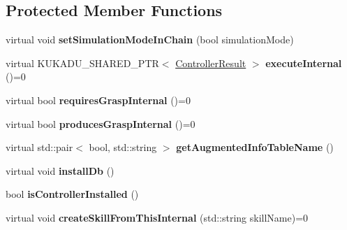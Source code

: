 \subsection*{Protected Member Functions}
\begin{DoxyCompactItemize}
\item 
virtual void {\bfseries set\+Simulation\+Mode\+In\+Chain} (bool simulation\+Mode)\hypertarget{classkukadu_1_1Controller_a07c70a71d6028cb711567d55e2010430}{}\label{classkukadu_1_1Controller_a07c70a71d6028cb711567d55e2010430}

\item 
virtual K\+U\+K\+A\+D\+U\+\_\+\+S\+H\+A\+R\+E\+D\+\_\+\+P\+TR$<$ \hyperlink{classkukadu_1_1ControllerResult}{Controller\+Result} $>$ {\bfseries execute\+Internal} ()=0\hypertarget{classkukadu_1_1Controller_ad32ce108f7ab90d8631e7262239433ac}{}\label{classkukadu_1_1Controller_ad32ce108f7ab90d8631e7262239433ac}

\item 
virtual bool {\bfseries requires\+Grasp\+Internal} ()=0\hypertarget{classkukadu_1_1Controller_ae67659a3a55cef09b2a5575107d88145}{}\label{classkukadu_1_1Controller_ae67659a3a55cef09b2a5575107d88145}

\item 
virtual bool {\bfseries produces\+Grasp\+Internal} ()=0\hypertarget{classkukadu_1_1Controller_a5566a7cf711318f1bf4dcd939ba7fe76}{}\label{classkukadu_1_1Controller_a5566a7cf711318f1bf4dcd939ba7fe76}

\item 
virtual std\+::pair$<$ bool, std\+::string $>$ {\bfseries get\+Augmented\+Info\+Table\+Name} ()\hypertarget{classkukadu_1_1Controller_a253f0cdc788a49d3d7ff325bbdbd2252}{}\label{classkukadu_1_1Controller_a253f0cdc788a49d3d7ff325bbdbd2252}

\item 
virtual void {\bfseries install\+Db} ()\hypertarget{classkukadu_1_1Controller_a57e89bfd0fdf2fd1c9991dce2a0a9196}{}\label{classkukadu_1_1Controller_a57e89bfd0fdf2fd1c9991dce2a0a9196}

\item 
bool {\bfseries is\+Controller\+Installed} ()\hypertarget{classkukadu_1_1Controller_a8ae66f58c5dcd2e548e933b3d1bf395e}{}\label{classkukadu_1_1Controller_a8ae66f58c5dcd2e548e933b3d1bf395e}

\item 
virtual void {\bfseries create\+Skill\+From\+This\+Internal} (std\+::string skill\+Name)=0\hypertarget{classkukadu_1_1Controller_a83ec6ad1794980392e897edc2916c9ce}{}\label{classkukadu_1_1Controller_a83ec6ad1794980392e897edc2916c9ce}

\end{DoxyCompactItemize}
